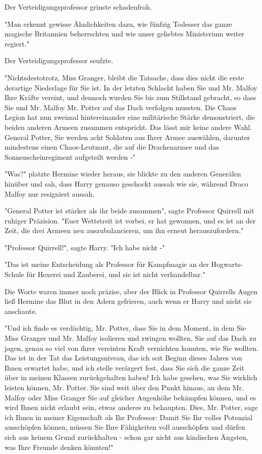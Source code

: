 {Der Verteidigungsprofessor grinste schadenfroh.

"Man erkennt gewisse Ähnlichkeiten dazu, wie fünfzig Todesser das ganze magische Britannien beherrschten und wie unser geliebtes Ministerium weiter regiert."

Der Verteidigungsprofessor seufzte.

"Nichtsdestotrotz, Miss Granger, bleibt die Tatsache, dass dies nicht die erste derartige Niederlage für Sie ist. In der letzten Schlacht haben Sie und Mr. Malfoy Ihre Kräfte vereint, und dennoch wurden Sie bis zum Stillstand gebracht, so dass Sie und Mr. Malfoy Mr. Potter auf das Dach verfolgen mussten. Die Chaos Legion hat nun zweimal hintereinander eine militärische Stärke demonstriert, die beiden anderen Armeen zusammen entspricht. Das lässt mir keine andere Wahl. General Potter, Sie werden acht Soldaten aus Ihrer Armee auswählen, darunter mindestens einen Chaos-Leutnant, die auf die Drachenarmee und das Sonnenscheinregiment aufgeteilt werden -"

"Was?" platzte Hermine wieder heraus, sie blickte zu den anderen Generälen hinüber und sah, dass Harry genauso geschockt aussah wie sie, während Draco Malfoy nur resigniert aussah.

"General Potter ist stärker als ihr beide zusammen", sagte Professor Quirrell mit ruhiger Präzision. "Euer Wettstreit ist vorbei, er hat gewonnen, und es ist an der Zeit, die drei Armeen neu auszubalancieren, um ihn erneut herauszufordern."

"Professor Quirrell!", sagte Harry. "Ich habe nicht -"

"Das ist meine Entscheidung als Professor für Kampfmagie an der Hogwarts-Schule für Hexerei und Zauberei, und sie ist nicht verhandelbar."

Die Worte waren immer noch präzise, aber der Blick in Professor Quirrells Augen ließ Hermine das Blut in den Adern gefrieren, auch wenn er Harry und nicht sie anschaute.

"Und ich finde es verdächtig, Mr. Potter, dass Sie in dem Moment, in dem Sie Miss Granger und Mr. Malfoy isolieren und zwingen wollten, Sie auf das Dach zu jagen, genau so viel von ihrer vereinten Kraft vernichten konnten, wie Sie wollten. Das ist in der Tat das Leistungsniveau, das ich seit Beginn dieses Jahres von Ihnen erwartet habe, und ich stelle verärgert fest, dass Sie sich die ganze Zeit über in meinen Klassen zurückgehalten haben! Ich habe gesehen, was Sie wirklich leisten können, Mr. Potter. Sie sind weit über den Punkt hinaus, an dem Mr. Malfoy oder Miss Granger Sie auf gleicher Augenhöhe bekämpfen können, und es wird Ihnen nicht erlaubt sein, etwas anderes zu behaupten. Dies, Mr. Potter, sage ich Ihnen in meiner Eigenschaft als Ihr Professor: Damit Sie Ihr volles Potenzial ausschöpfen können, müssen Sie Ihre Fähigkeiten voll ausschöpfen und dürfen sich aus keinem Grund zurückhalten - schon gar nicht aus kindischen Ängsten, was Ihre Freunde denken könnten!"

}
